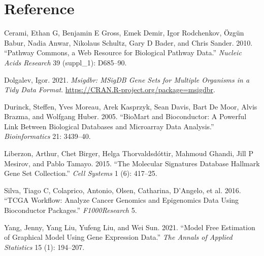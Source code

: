 \documentclass[
]{book}
\newlength{\cslhangindent}
\newlength{\cslentryspacingunit} %
\newenvironment{CSLReferences}[2] %
 {%
  \setlength{\parindent}{0pt}
  \ifodd #1
  \let\oldpar\par
  \def\par{\hangindent=\cslhangindent\oldpar}
  \fi
  \setlength{\parskip}{#2\cslentryspacingunit}
 }%
 {}
\begin{document}
\hypertarget{reference}{%
\chapter*{Reference}\label{reference}}

\hypertarget{refs}{}
\begin{CSLReferences}{1}{0}
\leavevmode{}%
Cerami, Ethan G, Benjamin E Gross, Emek Demir, Igor Rodchenkov, Özgün Babur, Nadia Anwar, Nikolaus Schultz, Gary D Bader, and Chris Sander. 2010. {``Pathway Commons, a Web Resource for Biological Pathway Data.''} \emph{Nucleic Acids Research} 39 (suppl\_1): D685--90.

\leavevmode{}%
Dolgalev, Igor. 2021. \emph{Msigdbr: MSigDB Gene Sets for Multiple Organisms in a Tidy Data Format}. \url{https://CRAN.R-project.org/package=msigdbr}.

\leavevmode{}%
Durinck, Steffen, Yves Moreau, Arek Kasprzyk, Sean Davis, Bart De Moor, Alvis Brazma, and Wolfgang Huber. 2005. {``BioMart and Bioconductor: A Powerful Link Between Biological Databases and Microarray Data Analysis.''} \emph{Bioinformatics} 21: 3439--40.

\leavevmode{}%
Liberzon, Arthur, Chet Birger, Helga Thorvaldsdóttir, Mahmoud Ghandi, Jill P Mesirov, and Pablo Tamayo. 2015. {``The Molecular Signatures Database Hallmark Gene Set Collection.''} \emph{Cell Systems} 1 (6): 417--25.

\leavevmode{}%
Silva, Tiago C, Colaprico, Antonio, Olsen, Catharina, D'Angelo, et al. 2016. {``TCGA Workflow: Analyze Cancer Genomics and Epigenomics Data Using Bioconductor Packages.''} \emph{F1000Research} 5.

\leavevmode{}%
Yang, Jenny, Yang Liu, Yufeng Liu, and Wei Sun. 2021. {``Model Free Estimation of Graphical Model Using Gene Expression Data.''} \emph{The Annals of Applied Statistics} 15 (1): 194--207.

\end{CSLReferences}
\end{document}
